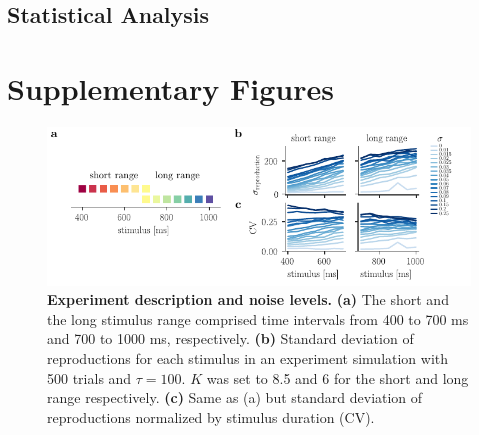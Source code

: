 \documentclass[10pt]{article}
\begin{document}
\subsection*{Statistical Analysis}

\section{Supplementary Figures}
\begin{figure}[!htb]
	\centering
	\includegraphics{figures/supp_CV.pdf}
	\caption{\textbf{Experiment description and noise levels.} 
	\textbf{(a)} The short and the long stimulus range comprised time intervals from 400 to 700 ms and 700 to 1000 ms, respectively.
	\textbf{(b)} Standard deviation of reproductions for each stimulus in an experiment simulation with 500 trials and $\tau=100$. $K$ was set to 8.5 and 6 for the short and long range respectively. 
	\textbf{(c)} Same as (a) but standard deviation of reproductions normalized by stimulus duration (CV).
	}
\label{sup:CV}
\end{figure}
\end{document}

